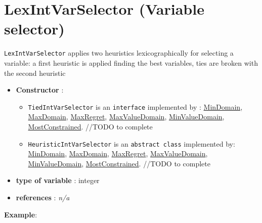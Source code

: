 \section{LexIntVarSelector (Variable selector)}\label{lexintvarselector:lexintvarselectorvarselector}\hypertarget{lexintvarselector:lexintvarselectorvarselector}{}
\begin{notedef}
  \texttt{LexIntVarSelector} applies two heuristics lexicographically for selecting a variable: a first heuristic is applied finding the best variables, ties are broken with the second heuristic 
\end{notedef}

\begin{itemize}
	\item \textbf{Constructor} :
	\begin{itemize}
\item \texttt{TiedIntVarSelector} is an \texttt{interface} implemented by : \hyperlink{mindomain:mindomainvarselector}{MinDomain}, \hyperlink{maxdomain:maxdomainvarselector}{MaxDomain}, \hyperlink{maxregret:maxregretvarselector}{MaxRegret}, \hyperlink{maxvaldomain:maxvaldomainvarselector}{MaxValueDomain}, \hyperlink{minvaldomain:minvaldomainvarselector}{MinValueDomain}, \hyperlink{mostconstrained:mostconstrainedvarselector}{MostConstrained}. //TODO to complete

\item \texttt{HeuristicIntVarSelector} is an \texttt{abstract class}  implemented by: \hyperlink{mindomain:mindomainvarselector}{MinDomain}, \hyperlink{maxdomain:maxdomainvarselector}{MaxDomain}, \hyperlink{maxregret:maxregretvarselector}{MaxRegret}, \hyperlink{maxvaldomain:maxvaldomainvarselector}{MaxValueDomain}, \hyperlink{minvaldomain:minvaldomainvarselector}{MinValueDomain}, \hyperlink{mostconstrained:mostconstrainedvarselector}{MostConstrained}. //TODO to complete

\end{itemize}

	\item \textbf{type of variable} : integer
	\item \textbf{references} : \emph{n/a}
\end{itemize}

\textbf{Example}:
%

